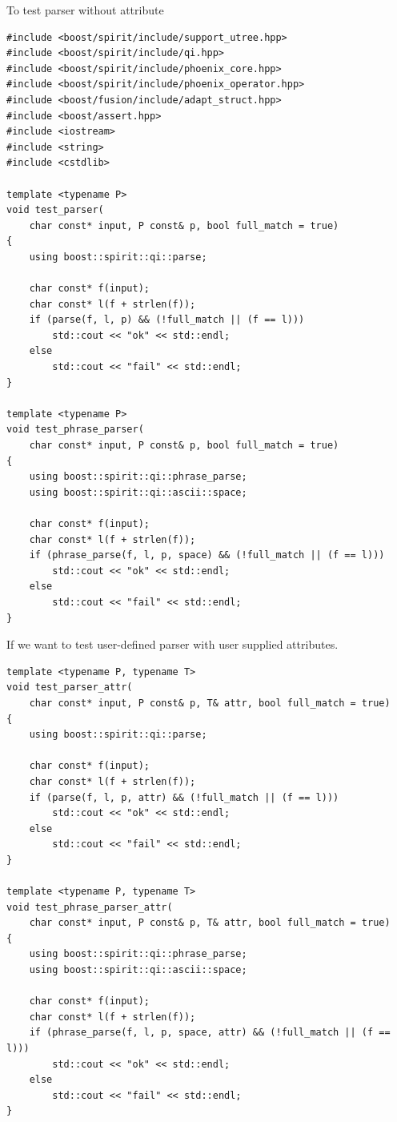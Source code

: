 To test parser without attribute
\begin{lstlisting}
#include <boost/spirit/include/support_utree.hpp>
#include <boost/spirit/include/qi.hpp>
#include <boost/spirit/include/phoenix_core.hpp>
#include <boost/spirit/include/phoenix_operator.hpp>
#include <boost/fusion/include/adapt_struct.hpp>
#include <boost/assert.hpp>
#include <iostream>
#include <string>
#include <cstdlib>

template <typename P>
void test_parser(
    char const* input, P const& p, bool full_match = true)
{
    using boost::spirit::qi::parse;

    char const* f(input);
    char const* l(f + strlen(f));
    if (parse(f, l, p) && (!full_match || (f == l)))
        std::cout << "ok" << std::endl;
    else
        std::cout << "fail" << std::endl;
}

template <typename P>
void test_phrase_parser(
    char const* input, P const& p, bool full_match = true)
{
    using boost::spirit::qi::phrase_parse;
    using boost::spirit::qi::ascii::space;
    
    char const* f(input);
    char const* l(f + strlen(f));
    if (phrase_parse(f, l, p, space) && (!full_match || (f == l)))
        std::cout << "ok" << std::endl;
    else
        std::cout << "fail" << std::endl;
}
\end{lstlisting}

If we want to test user-defined parser with user supplied attributes.
\begin{lstlisting}
template <typename P, typename T>
void test_parser_attr(
    char const* input, P const& p, T& attr, bool full_match = true)
{
    using boost::spirit::qi::parse;

    char const* f(input);
    char const* l(f + strlen(f));
    if (parse(f, l, p, attr) && (!full_match || (f == l)))
        std::cout << "ok" << std::endl;
    else
        std::cout << "fail" << std::endl;
}

template <typename P, typename T>
void test_phrase_parser_attr(
    char const* input, P const& p, T& attr, bool full_match = true)
{
    using boost::spirit::qi::phrase_parse;
    using boost::spirit::qi::ascii::space;

    char const* f(input);
    char const* l(f + strlen(f));
    if (phrase_parse(f, l, p, space, attr) && (!full_match || (f == l)))
        std::cout << "ok" << std::endl;
    else
        std::cout << "fail" << std::endl;
}
\end{lstlisting}

